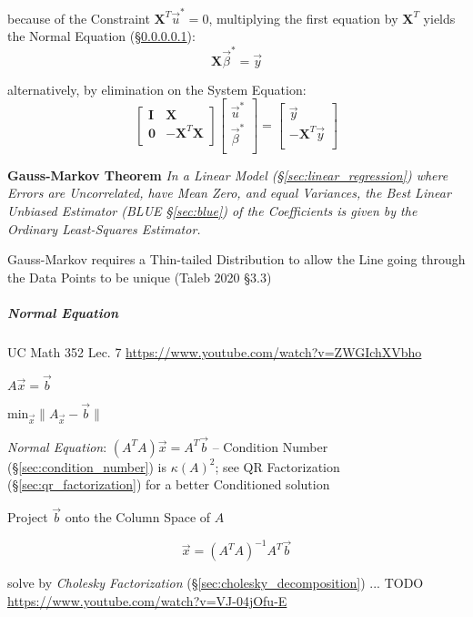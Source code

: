 because of the Constraint $\mathbf{X}^T \vec{u}^* = 0$, multiplying the first
equation by $\mathbf{X}^T$ yields the Normal Equation
(\S\ref{sec:normal_equation}):
\[
  \mathbf{X}\vec{\beta}^* = \vec{y}
\]

alternatively, by elimination on the System Equation:
\[
  \begin{bmatrix}
    \mathbf{I} & \mathbf{X} \\
    \mathbf{0} & -\mathbf{X}^T\mathbf{X} \\
  \end{bmatrix} \begin{bmatrix}
    \vec{u}^*     \\
    \vec{\beta}^* \\
  \end{bmatrix} = \begin{bmatrix}
    \vec{y} \\
    -\mathbf{X}^T \vec{y} \\
  \end{bmatrix}
\]

\textbf{Gauss-Markov Theorem} \emph{
  In a Linear Model (\S\ref{sec:linear_regression}) where Errors are
  Uncorrelated, have Mean Zero, and equal Variances, the Best Linear Unbiased
  Estimator (BLUE \S\ref{sec:blue}) of the Coefficients is given by the Ordinary
  Least-Squares Estimator.
}

Gauss-Markov requires a Thin-tailed Distribution to allow the Line going
through the Data Points to be unique (Taleb 2020 \S 3.3)



\subparagraph{Normal Equation}\label{sec:normal_equation}\hfill

UC Math 352 Lec. 7 \url{https://www.youtube.com/watch?v=ZWGIchXVbho}

$A\vec{x} = \vec{b}$

$\mathrm{min}_{\vec{x}} \|A_{\vec{x}} - \vec{b}\|$

\emph{Normal Equation}: $(A^TA)\vec{x} = A^T\vec{b}$ -- Condition Number
(\S\ref{sec:condition_number}) is $\kappa(A)^2$; see QR Factorization
(\S\ref{sec:qr_factorization}) for a better Conditioned solution

Project $\vec{b}$ onto the Column Space of $A$

\[
  \vec{x} = (A^TA)^{-1}A^T\vec{b}
\]

solve by \emph{Cholesky Factorization} (\S\ref{sec:cholesky_decomposition}) ...
TODO \url{https://www.youtube.com/watch?v=VJ-04jOfu-E}



